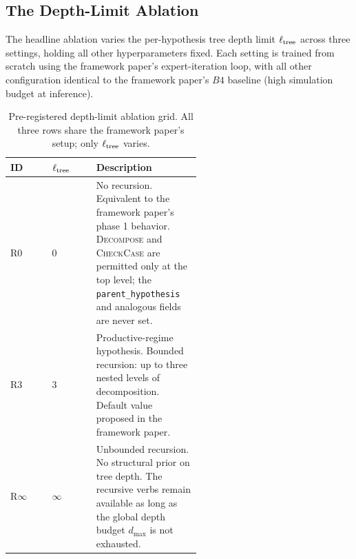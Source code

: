 
\subsection{The Depth-Limit Ablation}
\label{sec:exp-ablation}

The headline ablation varies the per-hypothesis tree depth limit
$\ell_{\mathrm{tree}}$ across three settings, holding all other hyperparameters
fixed. Each setting is trained from scratch using the framework paper's
expert-iteration loop, with all other configuration identical to the
framework paper's $B4$ baseline (high simulation budget at inference).

\begin{table}[t]
\centering
\caption{Pre-registered depth-limit ablation grid. All three rows share
the framework paper's setup; only $\ell_{\mathrm{tree}}$ varies.}
\label{tab:depth-ablation}
\small
\begin{tabular}{@{}llp{0.55\linewidth}@{}}
\toprule
ID & $\ell_{\mathrm{tree}}$ & Description \\
\midrule
R0 & $0$       & No recursion. Equivalent to the framework paper's phase 1
                behavior. \textsc{Decompose} and \textsc{CheckCase} are
                permitted only at the top level; the
                \texttt{parent\_hypothesis} and analogous fields are
                never set. \\
R3 & $3$       & Productive-regime hypothesis. Bounded recursion: up to
                three nested levels of decomposition. Default value
                proposed in the framework paper. \\
R$\infty$ & $\infty$ & Unbounded recursion. No structural prior on
                tree depth. The recursive verbs remain available as
                long as the global depth budget $d_{\max}$ is not
                exhausted. \\
\bottomrule
\end{tabular}
\end{table}

